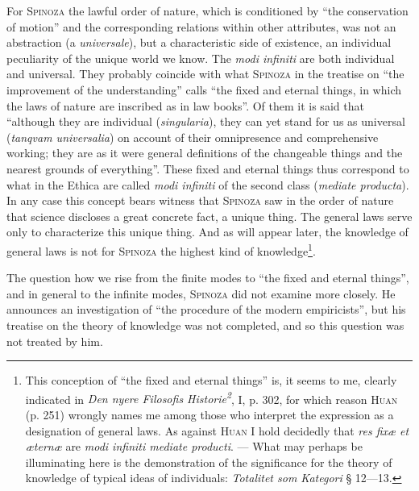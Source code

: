 \documentclass[12pt]{article}
\newcommand{\opage}[1]{\marginnote{\footnotesize\textit{[#1]}}}
\begin{document}
For \textsc{Spinoza} the lawful order of nature, which is conditioned by ``the
conservation of motion'' and the corresponding relations within other attributes, was not
an abstraction (a \textit{universale}), but a characteristic side of existence, an
individual peculiarity of the unique world we know. The \textit{modi infiniti} are both
individual and universal. They probably coincide with what \textsc{Spinoza} in the
treatise on ``the improvement of the understanding'' calls ``the fixed and eternal things,
in which the laws of nature are inscribed as in law books''. Of them it is said that
``although they are individual (\textit{singularia}), they can yet stand for us as
universal (\textit{tanqvam universalia}) on account of their omnipresence and
comprehensive working; they are as it were general definitions of the changeable things
and the nearest grounds of everything''. These fixed and eternal things thus correspond to
what in the Ethica are called \textit{modi infiniti} of the second class (\textit{mediate
producta}). In any case this concept bears witness that \textsc{Spinoza} saw in the order
of nature that science discloses a great concrete fact, a unique thing. The general laws
serve only to characterize this unique thing. And as \opage{31}will appear later, the
knowledge of general laws is not for \textsc{Spinoza} the highest kind of
knowledge\footnote{This conception of ``the fixed and eternal things'' is, it seems to
me, clearly indicated in \textit{Den nyere Filosofis Historie\textsuperscript{2}}, I,
p. 302, for which reason \textsc{Huan} (p. 251) wrongly names me among those who
interpret the expression as a designation of general laws. As against \textsc{Huan} I
hold decidedly that \textit{res fixæ et æternæ} are \textit{modi infiniti mediate
producti}. --- What may perhaps be illuminating here is the demonstration of the
significance for the theory of knowledge of typical ideas of individuals:
\textit{Totalitet som Kategori} § 12---13.}.

The question how we rise from the finite modes to ``the fixed and eternal things'', and in
general to the infinite modes, \textsc{Spinoza} did not examine more closely. He announces
an investigation of ``the procedure of the modern empiricists'', but his treatise on the
theory of knowledge was not completed, and so this question was not treated by him.
\end{document}
